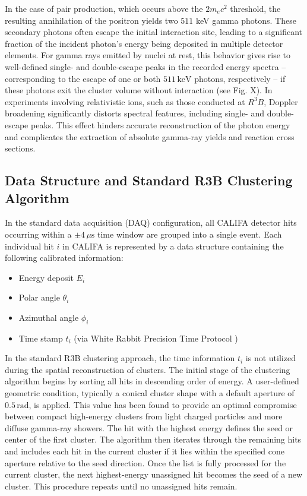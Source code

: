 \documentclass[final,5p,times,twocolumn]{elsarticle}
\begin{document}
In the case of pair production, which occurs above the $2m_ec^2$ threshold, the resulting annihilation of the positron yields two $511$ keV gamma photons. These secondary photons often escape the initial interaction site, leading to a significant fraction of the incident photon’s energy being deposited in multiple detector elements.\newline
For gamma rays emitted by nuclei at rest, this behavior gives rise to well-defined single- and double-escape peaks in the recorded energy spectra -- corresponding to the escape of one or both $511\,\mathrm{keV}$ photons, respectively -- if these photons exit the cluster volume without interaction (see Fig. X).\newline
In experiments involving relativistic ions, such as those conducted at $R^3B$, Doppler broadening significantly distorts spectral features, including single- and double-escape peaks. This effect hinders accurate reconstruction of the photon energy and complicates the extraction of absolute gamma-ray yields and reaction cross sections.

\subsection{Data Structure and Standard R3B Clustering Algorithm}\label{s_sec:r3b_clustering}
In the standard data acquisition (DAQ) configuration, all CALIFA detector hits occurring within a $\pm 4\,\mu\mathrm{s}$ time window are grouped into a single event. Each individual hit $i$ in CALIFA is represented by a data structure containing the following calibrated information:
\begin{itemize}
    \item Energy deposit $E_i$
    \item Polar angle $\theta_i$
    \item Azimuthal angle $\phi_i$
    \item Time stamp $t_i$ (via White Rabbit  Precision Time Protocol \cite{lipinski2011white})
\end{itemize}
In the standard R3B clustering approach, the time information $t_i$ is not utilized during the spatial reconstruction of clusters.\newline
The initial stage of the clustering algorithm begins by sorting all hits in descending order of energy. A user-defined geometric condition, typically a conical cluster shape with a default aperture of $0.5\,\mathrm{rad}$, is applied. This value has been found to provide an optimal compromise between compact high-energy clusters from light charged particles and more diffuse gamma-ray showers.\newline
The hit with the highest energy defines the seed or center of the first cluster. The algorithm then iterates through the remaining hits and includes each hit in the current cluster if it lies within the specified cone aperture relative to the seed direction. Once the list is fully processed for the current cluster, the next highest-energy unassigned hit becomes the seed of a new cluster. This procedure repeats until no unassigned hits remain.\newline
\end{document}
